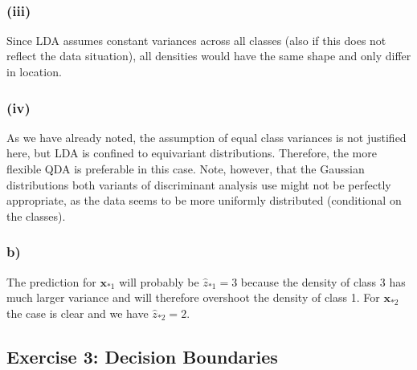 \documentclass[11pt]{article}
\newcommand{\xv}{\mathbf{x}} %
\begin{document}
    \begin{center}
    \end{center}
    { \hspace*{\fill} \\}
    
    
    \subsubsection*{(iii)}
    Since LDA assumes constant variances across 
    all classes (also if this does not reflect the data situation), all 
    densities would have the same shape and only differ in location. 
    
    \subsubsection*{(iv)}
    
    As we have already noted, the assumption of equal class variances is 
    not justified here, but LDA is confined to equivariant distributions. 
    Therefore, the more flexible QDA is preferable in this case.
    Note, however, that the Gaussian distributions both variants of discriminant 
    analysis use might not be perfectly appropriate, as the data seems to 
    be more uniformly distributed (conditional on the classes).
    
    \subsubsection*{b)}
    
    The prediction for $\xv_{\ast 1}$ will probably be $\hat z_{\ast 1} = 3$ 
    because the density of class 3 has much larger variance and will therefore 
    overshoot the density of class 1. 
    For $\xv_{\ast 2}$ the case is clear and we have 
    $\hat z_{\ast 2} = 2$.
    
    \hypertarget{exercise-3-decision-boundaries}{%
\subsection*{Exercise 3: Decision
Boundaries}\label{exercise-3-decision-boundaries}}
\end{document}

